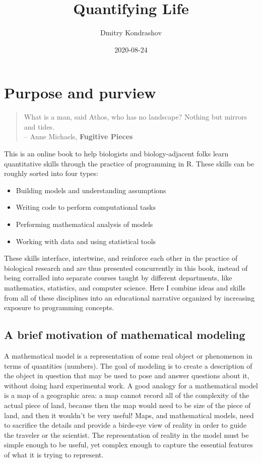 \documentclass[
]{book}
\title{Quantifying Life}
\author{Dmitry Kondrashov}
\date{2020-08-24}
\begin{document}
\maketitle

{
\setcounter{tocdepth}{1}
\tableofcontents
}
\hypertarget{purpose-and-purview}{%
\chapter{Purpose and purview}\label{purpose-and-purview}}

\begin{quote}
What is a man, said Athos, who has no landscape? Nothing but mirrors and tides.\\
-- Anne Michaels, \textbf{Fugitive Pieces}
\end{quote}

This is an online book to help biologists and biology-adjacent folks learn quantitative skills through the practice of programming in R. These skills can be roughly sorted into four types:

\begin{itemize}
\item
  Building models and understanding assumptions
\item
  Writing code to perform computational tasks
\item
  Performing mathematical analysis of models
\item
  Working with data and using statistical tools
\end{itemize}

These skills interface, intertwine, and reinforce each other in the practice of biological research and are thus presented concurrently in this book, instead of being corralled into separate courses taught by different departments, like mathematics, statistics, and computer science. Here I combine ideas and skills from all of these disciplines into an educational narrative organized by increasing exposure to programming concepts.

\hypertarget{a-brief-motivation-of-mathematical-modeling}{%
\section{A brief motivation of mathematical modeling}\label{a-brief-motivation-of-mathematical-modeling}}

A mathematical model  is a representation of some real object or phenomenon in terms of quantities (numbers). The goal of modeling is to create a description of the object in question that may be used to pose and answer questions about it, without doing hard experimental work. A good analogy for a mathematical model is a map of a geographic area: a map cannot record all of the complexity of the actual piece of land, because then the map would need to be size of the piece of land, and then it wouldn't be very useful! Maps, and mathematical models, need to sacrifice the details and provide a birds-eye view of reality in order to guide the traveler or the scientist. The representation of reality in the model must be simple enough to be useful, yet complex enough to capture the essential features of what it is trying to represent.
\end{document}
